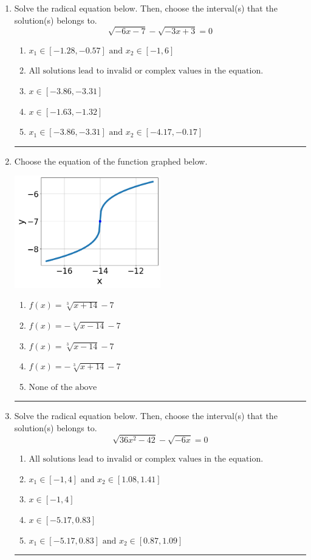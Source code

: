 \documentclass[14pt]{extbook}
\newcommand{\litem}[1]{\item#1\hspace*{-1cm}\rule{\textwidth}{0.4pt}}
\begin{document}
\begin{enumerate}
{\begin{enumerate}[label=\Alph*.]
\end{enumerate} }
\litem{
Solve the radical equation below. Then, choose the interval(s) that the solution(s) belongs to.\[ \sqrt{-6 x - 7} - \sqrt{-3 x + 3} = 0 \]\begin{enumerate}[label=\Alph*.]
\item \( x_1 \in [-1.28, -0.57] \text{ and } x_2 \in [-1,6] \)
\item \( \text{All solutions lead to invalid or complex values in the equation.} \)
\item \( x \in [-3.86,-3.31] \)
\item \( x \in [-1.63,-1.32] \)
\item \( x_1 \in [-3.86, -3.31] \text{ and } x_2 \in [-4.17,-0.17] \)

\end{enumerate} }
\litem{
Choose the equation of the function graphed below.
\begin{center}
    \includegraphics[width=0.5\textwidth]{../Figures/radicalGraphToEquationCopyC.png}
\end{center}
\begin{enumerate}[label=\Alph*.]
\item \( f(x) = \sqrt[3]{x + 14} - 7 \)
\item \( f(x) = - \sqrt[3]{x - 14} - 7 \)
\item \( f(x) = \sqrt[3]{x - 14} - 7 \)
\item \( f(x) = - \sqrt[3]{x + 14} - 7 \)
\item \( \text{None of the above} \)

\end{enumerate} }
\litem{
Solve the radical equation below. Then, choose the interval(s) that the solution(s) belongs to.\[ \sqrt{36 x^2 - 42} - \sqrt{-6 x} = 0 \]\begin{enumerate}[label=\Alph*.]
\item \( \text{All solutions lead to invalid or complex values in the equation.} \)
\item \( x_1 \in [-1, 4] \text{ and } x_2 \in [1.08,1.41] \)
\item \( x \in [-1,4] \)
\item \( x \in [-5.17,0.83] \)
\item \( x_1 \in [-5.17, 0.83] \text{ and } x_2 \in [0.87,1.09] \)


\end{enumerate}}
\end{enumerate}
\end{document}
